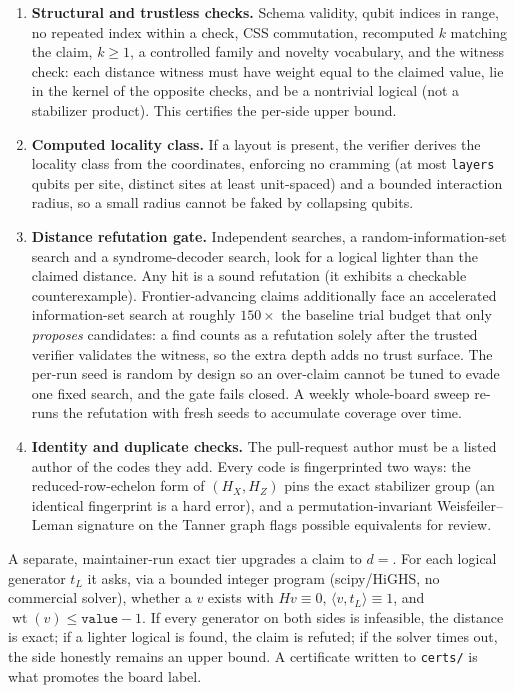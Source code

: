 \documentclass[11pt]{article}
\newcommand{\wt}{\operatorname{wt}}
\begin{document}
\begin{enumerate}[label=\arabic*.,leftmargin=*,nosep]
  \item \textbf{Structural and trustless checks.} Schema validity, qubit indices
  in range, no repeated index within a check, CSS commutation, recomputed $k$
  matching the claim, $k \ge 1$, a controlled family and novelty vocabulary, and
  the witness check: each distance witness must have weight equal to the claimed
  value, lie in the kernel of the opposite checks, and be a nontrivial logical
  (not a stabilizer product). This certifies the per-side upper bound.
  \item \textbf{Computed locality class.} If a layout is present, the verifier
  derives the locality class from the coordinates, enforcing no cramming (at most
  \texttt{layers} qubits per site, distinct sites at least unit-spaced) and a
  bounded interaction radius, so a small radius cannot be faked by collapsing
  qubits.
  \item \textbf{Distance refutation gate.} Independent searches, a
  random-information-set search and a syndrome-decoder search, look for a logical
  lighter than the claimed distance. Any hit is a sound refutation (it exhibits a
  checkable counterexample). Frontier-advancing claims additionally face an
  accelerated information-set search at roughly $150\times$ the baseline trial
  budget that only \emph{proposes} candidates: a find counts as a refutation
  solely after the trusted verifier validates the witness, so the extra depth
  adds no trust surface. The per-run seed is
  random by design so an over-claim cannot be tuned to evade one fixed search,
  and the gate fails closed. A weekly whole-board sweep re-runs the refutation
  with fresh seeds to accumulate coverage over time.
  \item \textbf{Identity and duplicate checks.} The pull-request author must be a
  listed author of the codes they add. Every code is fingerprinted two ways: the
  reduced-row-echelon form of $(H_X, H_Z)$ pins the exact stabilizer group (an
  identical fingerprint is a hard error), and a permutation-invariant
  Weisfeiler--Leman signature on the Tanner graph flags possible equivalents for
  review.
\end{enumerate}

A separate, maintainer-run exact tier upgrades a claim to $d =$. For each logical
generator $t_L$ it asks, via a bounded integer program (scipy/HiGHS, no
commercial solver), whether a $v$ exists with $H v \equiv 0$,
$\langle v, t_L\rangle \equiv 1$, and $\wt(v) \le \texttt{value} - 1$. If every
generator on both sides is infeasible, the distance is exact; if a lighter
logical is found, the claim is refuted; if the solver times out, the side
honestly remains an upper bound. A certificate written to \texttt{certs/} is what
promotes the board label.
\end{document}
